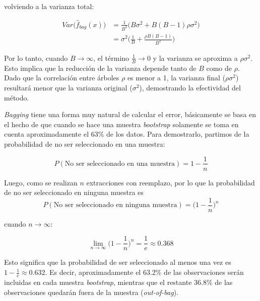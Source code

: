 volviendo a la varianza total:

\begin{equation}
    \begin{aligned}
		Var\Big(\hat{f}_{bag}(x)\Big) &= \frac{1}{B^2}\Big(B\sigma^{2}+B(B-1)\rho\sigma^{2}\Big) \\
		&= \sigma^{2}\Bigg(\frac{1}{B}+\frac{\rho B(B-1)}{B^2}\Bigg)
    \end{aligned}
\end{equation}


Por lo tanto, cuando $B \to \infty$, el término $\frac{1}{B} \to 0$ y la varianza se aproxima a $\rho\sigma^2$. Esto implica que la reducción de la varianza depende tanto de $B$ como de $\rho$. Dado que la correlación entre árboles $\rho$ es menor a 1, la varianza final ($\rho\sigma^2$) resultará menor que la varianza original ($\sigma^2$), demostrando la efectividad del método. 

\textit{Bagging} tiene una forma muy natural de calcular el error, básicamente se basa en el hecho de que cuando se hace una muestra \textit{bootstrap} solamente se toma en cuenta aproximadamente el 63\% de los datos. Para demostrarlo, partimos de la probabilidad de no ser seleccionado en una muestra:

\begin{equation}
P(\text{No ser seleccionado en una muestra}) = 1-\frac{1}{n}    
\end{equation}

Luego, como se realizan $n$ extracciones con reemplazo, por lo que la probabilidad de no ser seleccionado en ninguna muestra es
\begin{equation}
P(\text{No ser seleccionado en ninguna muestra}) = \Bigg(1-\frac{1}{n}\Bigg)^{n}
\end{equation}
	
cuando $n\rightarrow \infty$:
	
\begin{equation}
\lim_{n\rightarrow \infty}\Bigg(1-\frac{1}{n}\Bigg)^{n} = \frac{1}{e}\approx 0.368
\end{equation}
	
Esto significa que la probabilidad de ser seleccionado al menos una vez es $1-\frac{1}{e} \approx 0.632$. Es decir, aproximadamente el 63.2\% de las observaciones serán incluidas en cada muestra \textit{bootstrap}, mientras que el restante 36.8\% de las observaciones quedarán fuera de la muestra (\textit{out-of-bag}).

